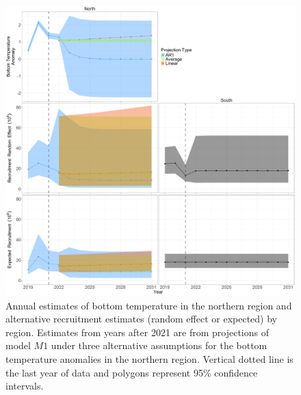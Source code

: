 \documentclass[
]{article}
\begin{document}
\begin{figure}

{\centering \includegraphics[height=0.95\textheight]{proj_ecov_Recruit_results} 

}

\caption{Annual estimates of bottom temperature in the northern region and alternative recruitment estimates (random effect or expected) by region. Estimates from years after 2021 are from projections of model $M1$ under three alternative assumptions for the bottom temperature anomalies in the northern region. Vertical dotted line is the last year of data and polygons represent 95\% confidence intervals.}\label{fig:R-BT-proj}
\end{figure}
\end{document}

